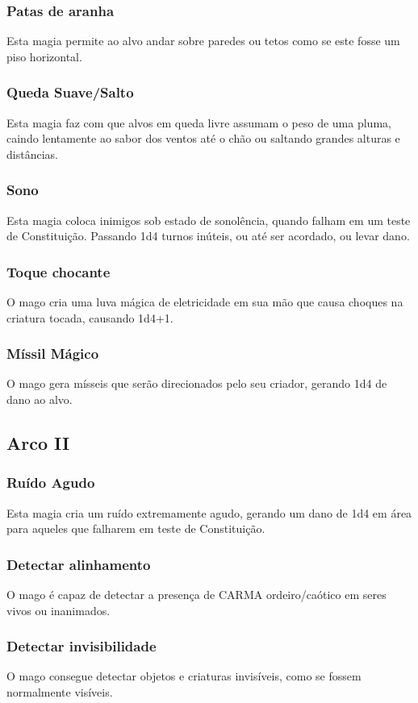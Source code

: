 \documentclass[10pt,twoside,twocolumn]{book}
\begin{document}
\subsubsection*{Patas de aranha}
Esta magia permite ao alvo andar sobre paredes ou tetos como se este fosse um
piso horizontal.
\subsubsection*{Queda Suave/Salto}
Esta magia faz com que alvos em queda livre assumam o peso de uma pluma, caindo lentamente ao sabor dos ventos até o chão ou saltando grandes alturas e distâncias.
\subsubsection*{Sono}
Esta magia coloca inimigos sob estado de sonolência, quando falham em um teste de Constituição. Passando 1d4 turnos inúteis, ou até ser acordado, ou levar dano.
\subsubsection*{Toque chocante}
O mago cria uma luva mágica de eletricidade em sua mão que causa choques na criatura tocada, causando 1d4+1.
\subsubsection*{Míssil Mágico}
O mago gera mísseis que serão direcionados pelo seu criador, gerando 1d4 de dano ao alvo.

\subsection*{Arco II}
\subsubsection*{Ruído Agudo}
Esta magia cria um ruído extremamente agudo, gerando um dano de 1d4 em área para aqueles que falharem em teste de Constituição.
\subsubsection*{Detectar alinhamento}
O mago é capaz de detectar a presença de CARMA ordeiro/caótico em seres vivos ou inanimados.
\subsubsection*{Detectar invisibilidade}
O mago consegue detectar objetos e criaturas invisíveis, como se fossem normalmente visíveis.
\end{document}
